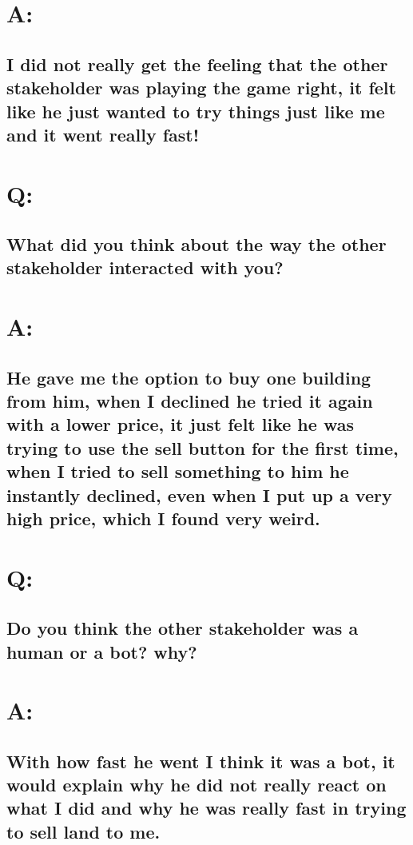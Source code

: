 \section*{A:}

\subsection*{I did not really get the feeling that the other stakeholder was playing the game right, it felt like he just wanted to try things just like me and it went really fast!}

\section*{Q:}

\subsection*{What did you think about the way the other stakeholder interacted with you?}

\section*{A:}

\subsection*{He gave me the option to buy one building from him, when I declined he tried it again with a lower price, it just felt like he was trying to use the sell button for the first time, when I tried to sell something to him he instantly declined, even when I put up a very high price, which I found very weird.}

\section*{Q:}

\subsection*{Do you think the other stakeholder was a human or a bot? why?}

\section*{A:}

\subsection*{With how fast he went I think it was a bot, it would explain why he did not really react on what I did and why he was really fast in trying to sell land to me.}


